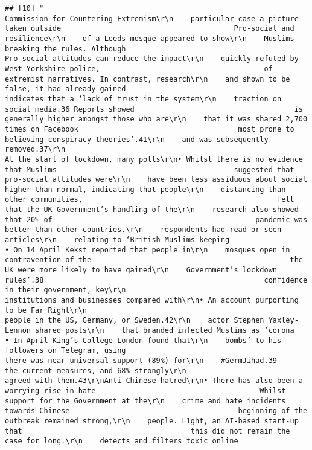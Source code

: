 \documentclass[
]{book}
\begin{document}
\begin{verbatim}
## [10] "                                                    Commission for Countering Extremism\r\n    particular case a picture taken outside                                        Pro-social and resilience\r\n    of a Leeds mosque appeared to show\r\n    Muslims breaking the rules. Although                                           Pro-social attitudes can reduce the impact\r\n    quickly refuted by West Yorkshire police,                                      of extremist narratives. In contrast, research\r\n    and shown to be false, it had already gained                                   indicates that a ‘lack of trust in the system\r\n    traction on social media.36 Reports showed                                     is generally higher amongst those who are\r\n    that it was shared 2,700 times on Facebook                                     most prone to believing conspiracy theories’.41\r\n    and was subsequently removed.37\r\n                                                                                   At the start of lockdown, many polls\r\n• Whilst there is no evidence that Muslims                                         suggested that pro-social attitudes were\r\n    have been less assiduous about social                                          higher than normal, indicating that people\r\n    distancing than other communities,                                             felt that the UK Government’s handling of the\r\n    research also showed that 20% of                                               pandemic was better than other countries.\r\n    respondents had read or seen articles\r\n    relating to ‘British Muslims keeping                                           • On 14 April Kekst reported that people in\r\n    mosques open in contravention of the                                              the UK were more likely to have gained\r\n    Government’s lockdown rules’.38                                                   confidence in their government, key\r\n                                                                                      institutions and businesses compared with\r\n• An account purporting to be Far Right\r\n                                                                                      people in the US, Germany, or Sweden.42\r\n    actor Stephen Yaxley-Lennon shared posts\r\n    that branded infected Muslims as ‘corona                                       • In April King’s College London found that\r\n    bombs’ to his followers on Telegram, using                                        there was near-universal support (89%) for\r\n    #GermJihad.39                                                                     the current measures, and 68% strongly\r\n                                                                                      agreed with them.43\r\nAnti-Chinese hatred\r\n• There has also been a worrying rise in hate                                      Whilst support for the Government at the\r\n    crime and hate incidents towards Chinese                                       beginning of the outbreak remained strong,\r\n    people. L1ght, an AI-based start-up that                                       this did not remain the case for long.\r\n    detects and filters toxic online 
\end{verbatim}
\end{document}
